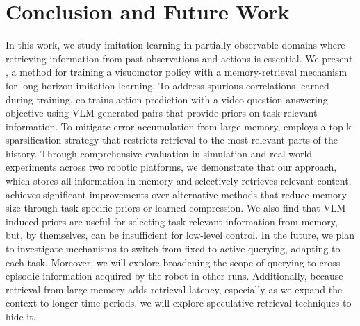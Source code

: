 \section{Conclusion and Future Work}
In this work, we study imitation learning in partially observable domains where retrieving information from past observations and actions is essential.
We present \ourmethod{}, a method for training a visuomotor policy with a memory-retrieval mechanism for long-horizon imitation learning.
To address spurious correlations learned during training, \ourmethod{} co-trains action prediction with a video question-answering objective using VLM-generated pairs that provide priors on task-relevant information.
To mitigate error accumulation from large memory, \ourmethod{} employs a top-k sparsification strategy that restricts retrieval to the most relevant parts of the history.
Through comprehensive evaluation in simulation and real-world experiments across two robotic platforms, we demonstrate that our approach, which stores all information in memory and selectively retrieves relevant content, achieves significant improvements over alternative methods that reduce memory size through task-specific priors or learned compression.
We also find that VLM-induced priors are useful for selecting task-relevant information from memory, but, by themselves, can be insufficient for low-level control. 
In the future, we plan to investigate mechanisms to switch from fixed to active querying, adapting to each task.
Moreover, we will explore broadening the scope of querying to cross-episodic information acquired by the robot in other runs.
Additionally, because retrieval from large memory adds retrieval latency, especially as we expand the context to longer time periods, we will explore speculative retrieval techniques to hide it.


